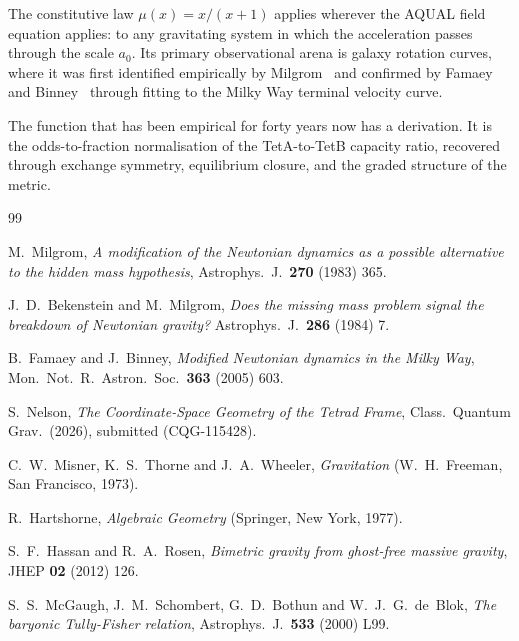 \documentclass[twocolumn]{iopjournal}
\begin{document}
The constitutive law $\mu(x) = x/(x+1)$ applies wherever the
AQUAL field equation applies: to any gravitating system in
which the acceleration passes through the scale $a_0$. Its
primary observational arena is galaxy rotation curves, where
it was first identified empirically by
Milgrom~\cite{Milgrom1983} and confirmed by Famaey and
Binney~\cite{FamaeyBinney2005} through fitting to the Milky
Way terminal velocity curve.

The function that has been empirical for forty years now has
a derivation. It is the odds-to-fraction normalisation of
the TetA-to-TetB capacity ratio, recovered through exchange
symmetry, equilibrium closure, and the graded structure of the
metric.


\begin{thebibliography}{99}

M.~Milgrom,
\textit{A modification of the Newtonian dynamics as a possible
alternative to the hidden mass hypothesis},
Astrophys.\ J.\ \textbf{270} (1983) 365.

J.~D.~Bekenstein and M.~Milgrom,
\textit{Does the missing mass problem signal the breakdown of
Newtonian gravity?}
Astrophys.\ J.\ \textbf{286} (1984) 7.

B.~Famaey and J.~Binney,
\textit{Modified Newtonian dynamics in the Milky Way},
Mon.\ Not.\ R.\ Astron.\ Soc.\ \textbf{363} (2005) 603.

S.~Nelson,
\textit{The Coordinate-Space Geometry of the Tetrad Frame},
Class.\ Quantum Grav.\ (2026), submitted (CQG-115428).

C.~W.~Misner, K.~S.~Thorne and J.~A.~Wheeler,
\textit{Gravitation}
(W.~H.~Freeman, San Francisco, 1973).

R.~Hartshorne,
\textit{Algebraic Geometry}
(Springer, New York, 1977).

S.~F.~Hassan and R.~A.~Rosen,
\textit{Bimetric gravity from ghost-free massive gravity},
JHEP \textbf{02} (2012) 126.

S.~S.~McGaugh, J.~M.~Schombert, G.~D.~Bothun and
W.~J.~G.~de~Blok,
\textit{The baryonic Tully-Fisher relation},
Astrophys.\ J.\ \textbf{533} (2000) L99.

\end{thebibliography}
\end{document}
